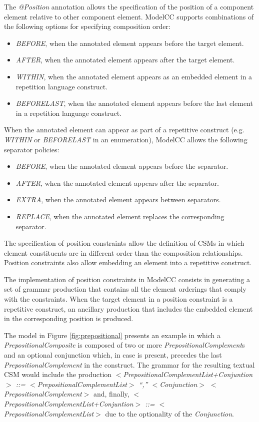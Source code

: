 \documentclass[a4paper,twoside,onecolumn]{article}
\newcommand{\etexttt}[1]{\textit{#1}}
\newcommand{\an}[1]{\emph{#1}} %
\begin{document}
The \an{@Position} annotation allows the specification of the position of a component element relative to other component element.
ModelCC supports combinations of the following options for specifying composition order:

\begin{itemize}
\item \an{BEFORE}, when the annotated element appears before the target element.
\item \an{AFTER}, when the annotated element appears after the target element.
\item \an{WITHIN}, when the annotated element appears as an embedded element in a repetition language construct.
\item \an{BEFORELAST}, when the annotated element appears before the last element in a repetition language construct.
\end{itemize}

When the annotated element can appear as part of a repetitive construct (e.g. \an{WITHIN} or \an{BEFORELAST} in an enumeration), ModelCC allows the following separator policies:

\begin{itemize}
\item \an{BEFORE}, when the annotated element appears before the separator.
\item \an{AFTER}, when the annotated element appears after the separator.
\item \an{EXTRA}, when the annotated element appears between separators.
\item \an{REPLACE}, when the annotated element replaces the corresponding separator.
\end{itemize}

The specification of position constraints allow the definition of CSMs in which element constituents are in different order than the composition relationships.
Position constraints also allow embedding an element into a repetitive construct.

The implementation of position constraints in ModelCC consists in generating a set of grammar production that contains all the element orderings that comply with the constraints.
When the target element in a position constraint is a repetitive construct, an ancillary production that includes the embedded element in the corresponding position is produced.

The model in Figure \ref{fig:prepositional} presents an example in which a \emph{PrepositionalComposite} is composed of two or more \emph{PrepositionalComplement}s and an optional conjunction which, in case is present, precedes the last \emph{PrepositionalComplement} in the construct.
The grammar for the resulting textual CSM would include the production \etexttt{$<$PrepositionalComplementList+Conjuntion$>$ ::= $<$PrepositionalComplementList$>$ ``,'' $<$Conjunction$>$ $<$PrepositionalComplement$>$} and, finally, \etexttt{$<$PrepositionalComplementList+Conjuntion$>$ ::= $<$PrepositionalComplementList$>$} due to the optionality of the \emph{Conjunction}.
\end{document}
